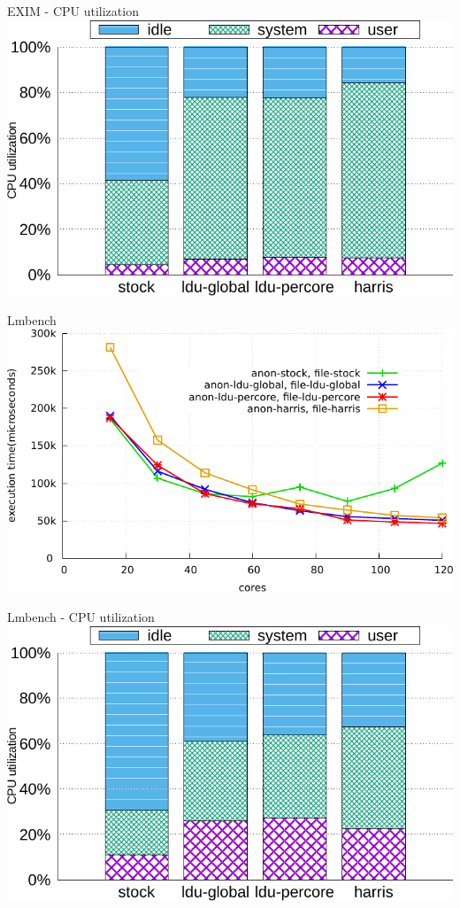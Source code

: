 \documentclass[english]{beamer} %
\begin{document}
\begin{frame}{EXIM - CPU utilization}
\includegraphics[scale=0.8]{graph/exim_cpuutils}
\end{frame}


\begin{frame}{Lmbench}
\includegraphics[scale=0.8]{graph/lmbench}
\end{frame}


\begin{frame}{Lmbench - CPU utilization}
\includegraphics[scale=0.8]{graph/lmbench_cpuutils}
\end{frame}
\end{document}
